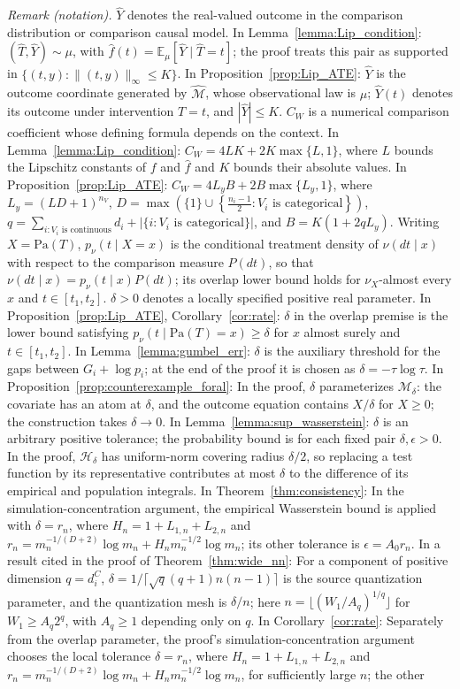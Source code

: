 \documentclass[12pt]{article}
\theoremstyle{plain}
\theoremstyle{definition}
\theoremstyle{remark}
\begin{document}
\noindent\textit{Remark (notation).} $\hat{Y}$ denotes the real-valued outcome in the comparison distribution or comparison causal model. In Lemma~\ref{lemma:Lip_condition}: $(\hat{T},\hat{Y})\sim\mu$, with $\hat{f}(t)=\mathbb{E}_{\mu}[\hat{Y}\mid\hat{T}=t]$; the proof treats this pair as supported in $\{(t,y):\|(t,y)\|_\infty\leqslant K\}$. In Proposition~\ref{prop:Lip_ATE}: $\hat{Y}$ is the outcome coordinate generated by $\hat{\mathcal{M}}$, whose observational law is $\mu$; $\hat{Y}(t)$ denotes its outcome under intervention $T=t$, and $|\hat{Y}|\leqslant K$. $C_W$ is a numerical comparison coefficient whose defining formula depends on the context. In Lemma~\ref{lemma:Lip_condition}: $C_W=4LK+2K\max\{L,1\}$, where $L$ bounds the Lipschitz constants of $f$ and $\hat{f}$ and $K$ bounds their absolute values. In Proposition~\ref{prop:Lip_ATE}: $C_W=4L_yB+2B\max\{L_y,1\}$, where $L_y=(LD+1)^{n_V}$, $D=\max\left(\{1\}\cup\left\{\frac{n_i-1}{2}:V_i\text{ is categorical}\right\}\right)$, $q=\sum_{i:V_i\text{ is continuous}}d_i+\left|\{i:V_i\text{ is categorical}\}\right|$, and $B=K(1+2qL_y)$. Writing $X=\text{Pa}(T)$, $p_\nu(t\mid X=x)$ is the conditional treatment density of $\nu(dt\mid x)$ with respect to the comparison measure $P(dt)$, so that $\nu(dt\mid x)=p_\nu(t\mid x)P(dt)$; its overlap lower bound holds for $\nu_X$-almost every $x$ and $t\in[t_1,t_2]$. $\delta>0$ denotes a locally specified positive real parameter. In Proposition~\ref{prop:Lip_ATE}, Corollary~\ref{cor:rate}: $\delta$ in the overlap premise is the lower bound satisfying $p_\nu(t\mid\text{Pa}(T)=x)\geqslant\delta$ for $x$ almost surely and $t\in[t_1,t_2]$. In Lemma~\ref{lemma:gumbel_err}: $\delta$ is the auxiliary threshold for the gaps between $G_i+\log p_i$; at the end of the proof it is chosen as $\delta=-\tau\log\tau$. In Proposition~\ref{prop:counterexample_foral}: In the proof, $\delta$ parameterizes $\mathcal{M}_\delta$: the covariate has an atom at $\delta$, and the outcome equation contains $X/\delta$ for $X\geqslant0$; the construction takes $\delta\rightarrow0$. In Lemma~\ref{lemma:sup_wasserstein}: $\delta$ is an arbitrary positive tolerance; the probability bound is for each fixed pair $\delta,\epsilon>0$. In the proof, $\mathcal H_\delta$ has uniform-norm covering radius $\delta/2$, so replacing a test function by its representative contributes at most $\delta$ to the difference of its empirical and population integrals. In Theorem~\ref{thm:consistency}: In the simulation-concentration argument, the empirical Wasserstein bound is applied with $\delta=r_n$, where $H_n=1+L_{1,n}+L_{2,n}$ and $r_n=m_n^{-1/(D+2)}\log m_n+H_nm_n^{-1/2}\log m_n$; its other tolerance is $\epsilon=A_0r_n$. In a result cited in the proof of Theorem~\ref{thm:wide_nn}: For a component of positive dimension $q=d_i^C$, $\delta=1/\lceil\sqrt q(q+1)n(n-1)\rceil$ is the source quantization parameter, and the quantization mesh is $\delta/n$; here $n=\lfloor(W_1/A_q)^{1/q}\rfloor$ for $W_1\geqslant A_q2^q$, with $A_q\geqslant1$ depending only on $q$. In Corollary~\ref{cor:rate}: Separately from the overlap parameter, the proof's simulation-concentration argument chooses the local tolerance $\delta=r_n$, where $H_n=1+L_{1,n}+L_{2,n}$ and $r_n=m_n^{-1/(D+2)}\log m_n+H_nm_n^{-1/2}\log m_n$, for sufficiently large $n$; the other 
\end{document}
